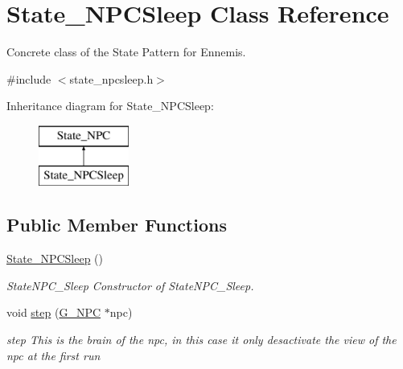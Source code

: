 \hypertarget{class_state___n_p_c_sleep}{}\section{State\+\_\+\+N\+P\+C\+Sleep Class Reference}
\label{class_state___n_p_c_sleep}


Concrete class of the State Pattern for Ennemis.  




{\ttfamily \#include $<$state\+\_\+npcsleep.\+h$>$}

Inheritance diagram for State\+\_\+\+N\+P\+C\+Sleep\+:\begin{figure}[H]
\begin{center}
\leavevmode
\includegraphics[height=2.000000cm]{class_state___n_p_c_sleep}
\end{center}
\end{figure}
\subsection*{Public Member Functions}
\begin{DoxyCompactItemize}
\item 
\hypertarget{class_state___n_p_c_sleep_adfef1c3c176bdd3c486dfaedb2bc566b}{}\hyperlink{class_state___n_p_c_sleep_adfef1c3c176bdd3c486dfaedb2bc566b}{State\+\_\+\+N\+P\+C\+Sleep} ()\label{class_state___n_p_c_sleep_adfef1c3c176bdd3c486dfaedb2bc566b}

\begin{DoxyCompactList}\small\item\em State\+N\+P\+C\+\_\+\+Sleep Constructor of State\+N\+P\+C\+\_\+\+Sleep. \end{DoxyCompactList}\item 
void \hyperlink{class_state___n_p_c_sleep_ad21b765e6749e9be78f646a7e122934f}{step} (\hyperlink{class_g___n_p_c}{G\+\_\+\+N\+P\+C} $\ast$npc)
\begin{DoxyCompactList}\small\item\em step This is the brain of the npc, in this case it only desactivate the view of the npc at the first run \end{DoxyCompactList}\end{DoxyCompactItemize}


